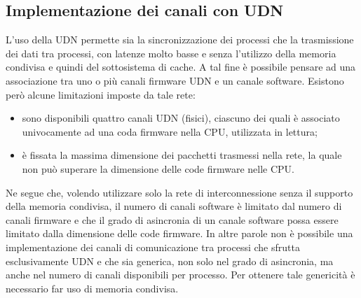 \FloatBarrier
\subsection{Implementazione dei canali con UDN}
\label{sct:specifica_udn}
L'uso della UDN permette sia la sincronizzazione dei processi che la trasmissione dei dati tra processi, con latenze molto basse e senza l'utilizzo della memoria condivisa e quindi del sottosistema di cache. A tal fine \`e possibile pensare ad una associazione tra uno o pi\`u canali firmware UDN e un canale software. Esistono per\`o alcune limitazioni imposte da tale rete: 
\begin{itemize}
\item sono disponibili quattro canali UDN (fisici), ciascuno dei quali \`e associato univocamente ad una coda firmware nella CPU, utilizzata in lettura;
\item \`e fissata la massima dimensione dei pacchetti trasmessi nella rete, la quale non pu\`o superare la dimensione delle code firmware nelle CPU.
\end{itemize}
Ne segue che, volendo utilizzare solo la rete di interconnessione senza il supporto della memoria condivisa, il numero di canali software \`e limitato dal numero di canali firmware e che il grado di asincronia di un canale software possa essere limitato dalla dimensione delle code firmware. In altre parole non \`e possibile una implementazione dei canali di comunicazione tra processi che sfrutta esclusivamente UDN e che sia generica, non solo nel grado di asincronia, ma anche nel numero di canali disponibili per processo. Per ottenere tale genericit\`a \`e necessario far uso di memoria condivisa.
\FloatBarrier
